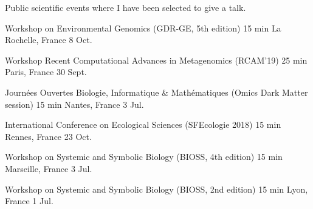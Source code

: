 
\begin{small}
Public scientific events where I have been selected to give a talk.
\end{small}


\begin{cvhonors}
  \cvhonor
    {Workshop on Environmental Genomics (GDR-GE, 5th edition)} %
    {15 min} %
    {La Rochelle, France} %
    {8 Oct.} %
    {} %
    
  \cvhonor
    {Workshop Recent Computational Advances in Metagenomics (RCAM'19)} %
    {25 min} %
    {Paris, France} %
    {30 Sept.} %
    {} %

  \cvhonor
    {Journées Ouvertes Biologie, Informatique \& Mathématiques (Omics Dark Matter session)}
    {15 min} %
    {Nantes, France} %
    {3 Jul.} %
    {} %
    
\end{cvhonors}


\begin{cvhonors}

  \cvhonor
    {International Conference on Ecological Sciences (SFEcologie 2018)} %
    {15 min} %
    {Rennes, France} %
    {23 Oct.} %
    {} %

  \cvhonor
    {Workshop on Systemic and Symbolic Biology (BIOSS, 4th edition)} %
    {15 min} %
    {Marseille, France} %
    {3 Jul.} %
    {} %

\end{cvhonors}


\begin{cvhonors}

  \cvhonor
    {Workshop on Systemic and Symbolic Biology (BIOSS, 2nd edition)} %
    {15 min} %
    {Lyon, France} %
    {1 Jul.} %
    {} %

\end{cvhonors}

